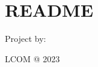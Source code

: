 \chapter{README}
\hypertarget{md__r_e_a_d_m_e}{}\label{md__r_e_a_d_m_e}
Project by\+:


\begin{DoxyItemize}
\item 
\item 
\item 
\item LCOM @ 2023 
\end{DoxyItemize}